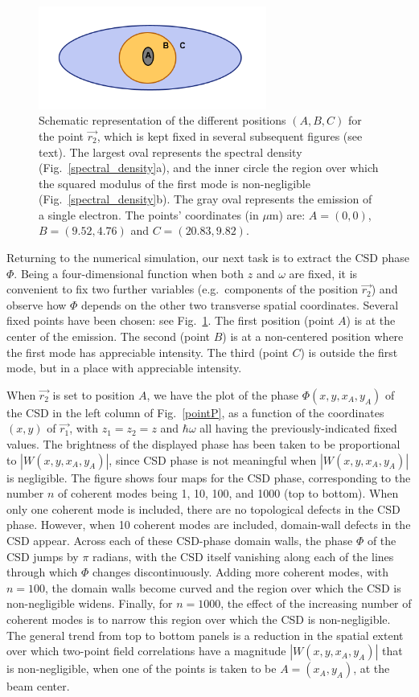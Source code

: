\documentclass[%
 reprint,
 amsmath,amssymb,
 aps,
]{revtex4-1}
\begin{document}
\begin{figure}
\includegraphics[trim=0 8mm 0 0,clip, width=7.5cm]{Figures/eye.png}
\caption{Schematic representation of the different positions $(A,B,C)$ for the point $\vec{r_2}$, which is kept fixed in several subsequent figures (see text). The largest oval represents the spectral density (Fig.~\ref{spectral_density}a), and the inner circle the region over which the squared modulus of the first mode is non-negligible (Fig.~\ref{spectral_density}b). The gray oval represents the emission of a single electron. 
The points' coordinates (in $\mu$m) are: $A=(0,0)$, $B=(9.52,4.76)$ and $C=(20.83,9.82)$.}
\label{eye}
\end{figure}

Returning to the numerical simulation, our next task is to extract the CSD phase $\Phi$. Being a four-dimensional function when both $z$ and $\omega$ are fixed, it is convenient to fix two further variables (e.g.~components of the position $\vec{r_2}$) and observe how $\Phi$ depends on the other two transverse spatial coordinates. Several fixed points have been chosen: see Fig.~\ref{eye}. The first position (point $A$) is at the center of the emission. The second (point $B$) is at a non-centered position where the first mode has appreciable intensity. The third (point $C$) is outside the first mode, but in a place with appreciable intensity.

When $\vec{r_2}$ is set to position $A$, we have the plot of the phase $\Phi(x,y,x_A,y_A)$ of the CSD in the left column of Fig.~\ref{pointP}, as a function of the coordinates $(x,y)$ of $\vec{r_1}$, with $z_1=z_2=z$ and $\hbar\omega$ all having the previously-indicated fixed values.  The brightness of the displayed phase has been taken to be proportional to $|W(x,y,x_A,y_A)|$, since CSD phase is not meaningful when $|W(x,y,x_A,y_A)|$ is negligible.  The figure shows four maps for the CSD phase, corresponding to the number $n$ of coherent modes being 1, 10, 100, and 1000 (top to bottom).  When only one coherent mode is included, there are no topological defects in the CSD phase.  However, when 10 coherent modes are included, domain-wall defects in the CSD appear.  Across each of these CSD-phase domain walls, the phase $\Phi$ of the CSD jumps by $\pi$ radians, with the CSD itself vanishing along each of the lines through which $\Phi$ changes discontinuously.  Adding more coherent modes, with $n=100$, the domain walls become curved and the region over which the CSD is non-negligible widens.  Finally, for $n=1000$, the effect of the increasing number of coherent modes is to narrow this region over which the CSD is non-negligible.  The general trend from top to bottom panels is a reduction in the spatial extent over which two-point field correlations have a magnitude $|W(x,y,x_A,y_A)|$ that is non-negligible, when one of the points is taken to be $A=(x_A,y_A)$, at the beam center.      
\end{document}
